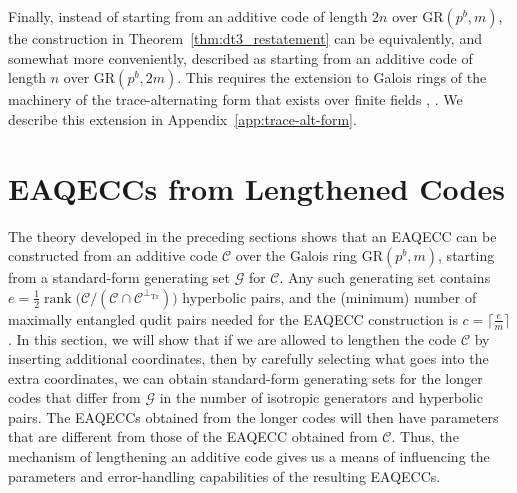 \documentclass{article}
\DeclareMathOperator{\Tr}{Tr}
\DeclareMathOperator{\rank}{rank}
\theoremstyle{remark}
\theoremstyle{definition}
\numberwithin{equation}{section}
\begin{document}
Finally, instead of starting from an additive code of length $2n$ over $\text{GR}(p^b,m)$, the construction in Theorem~\ref{thm:dt3_restatement} can be equivalently, and somewhat more conveniently, described as starting from an additive code of length $n$ over $\text{GR}(p^b,2m)$. This requires the extension to Galois rings of the machinery of the trace-alternating form that exists over finite fields \cite{calder}, \cite[Section~IV-B]{ketkar}. We describe this extension in Appendix~\ref{app:trace-alt-form}.

\section{EAQECCs from Lengthened Codes}\label{sec:lengthening}

The theory developed in the preceding sections shows that an EAQECC can be constructed from an additive code $\mathcal{C}$ over the Galois ring $\text{GR}(p^b,m)$, starting from a standard-form generating set $\mathcal{G}$ for $\mathcal{C}$. Any such generating set contains $e = \frac12 \rank\bigl(\mathcal{C} / (\mathcal{C} \cap \mathcal{C}^{\perp_{\Tr}})\bigr)$ hyperbolic pairs, and the (minimum) number of maximally entangled qudit pairs needed for the EAQECC construction is $c = \lceil\frac{e}{m}\rceil$. In this section, we will show that if we are allowed to lengthen the code $\mathcal{C}$ by inserting additional coordinates, then by carefully selecting what goes into the extra coordinates, we can obtain standard-form generating sets for the longer codes that differ from $\mathcal{G}$ in the number of isotropic generators and hyperbolic pairs. The EAQECCs obtained from the longer codes will then have parameters that are different from those of the EAQECC obtained from $\mathcal{C}$. Thus, the mechanism of lengthening an additive code gives us a means of influencing the parameters and error-handling capabilities of the resulting EAQECCs.
\end{document}
